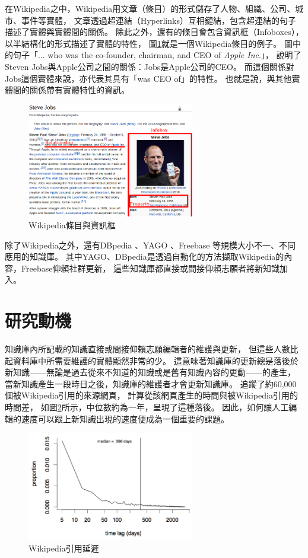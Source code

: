 在Wikipedia之中，Wikipedia用文章（條目）的形式儲存了人物、組織、公司、城市、事件等實體，
文章透過超連結（Hyperlinks）互相鏈結，包含超連結的句子描述了實體與實體間的關係。
除此之外，還有的條目會包含資訊框（Infoboxes），以半結構化的形式描述了實體的特性，
圖\ref{i:wiki}就是一個Wikipedia條目的例子。
圖中的句子「... who was the co-founder, chairman, and CEO of \emph{Apple Inc}.」，
說明了Steven Jobs與Apple公司之間的關係：Jobs是Apple公司的CEO。
而這個關係對Jobs這個實體來說，亦代表其具有「was CEO of」的特性。
也就是說，與其他實體間的關係帶有實體特性的資訊。

\begin{figure}
\centering
\includegraphics[width=0.65\textwidth]{images/01-wiki-as-kb}
\caption{Wikipedia條目與資訊框}
\label{i:wiki}
\end{figure}

除了Wikipedia之外，還有DBpedia \citep{dbpedia}、YAGO \citep{yago}、Freebase \citep{freebase}等規模大小不一、不同應用的知識庫。
其中YAGO、DBpedia是透過自動化的方法擷取Wikipedia的內容，Freebase仰賴社群更新，
這些知識庫都直接或間接仰賴志願者將新知識加入。

%
%
\section{研究動機}
知識庫內所記載的知識直接或間接仰賴志願編輯者的維護與更新，
但這些人數比起資料庫中所需要維護的實體顯然非常的少。
這意味著知識庫的更新總是落後於新知識——無論是過去從來不知道的知識或是舊有知識內容的更動——的產生，
當新知識產生一段時日之後，知識庫的維護者才會更新知識庫。
\cite{kba2012}追蹤了約60,000個被Wikipedia引用的來源網頁，
計算從該網頁產生的時間與被Wikipedia引用的時間差，
如圖\ref{i:wikicitenews}所示，中位數約為一年，呈現了這種落後。
因此，如何讓人工編輯的速度可以跟上新知識出現的速度便成為一個重要的課題。

\begin{figure}
    \centering
    \includegraphics[width=0.65\textwidth]{images/01-wiki-cite-delay}
    \caption{Wikipedia引用延遲}
    \label{i:wikicitenews}
\end{figure}

